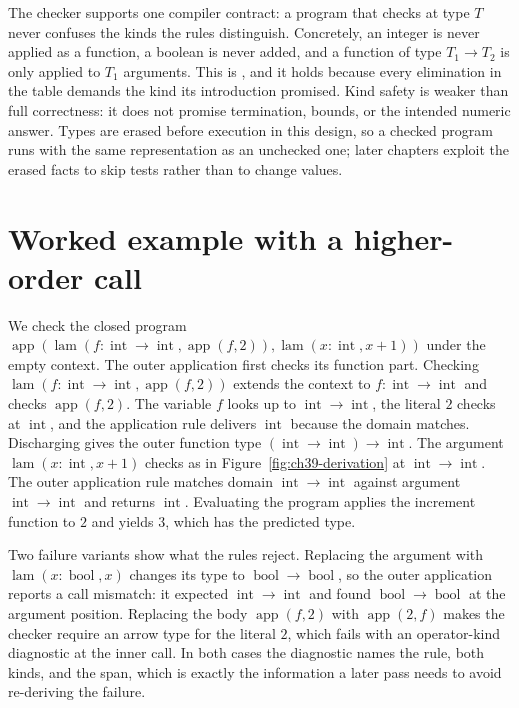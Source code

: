 The checker supports one compiler contract: a program that checks at type $T$ never confuses the kinds the rules distinguish.
Concretely, an integer is never applied as a function, a boolean is never added, and a function of type $T_1 \to T_2$ is only applied to $T_1$ arguments.
This is , and it holds because every elimination in the table demands the kind its introduction promised.
Kind safety is weaker than full correctness: it does not promise termination, bounds, or the intended numeric answer.
Types are erased before execution in this design, so a checked program runs with the same representation as an unchecked one; later chapters exploit the erased facts to skip tests rather than to change values.

\section{Worked example with a higher-order call}
\label{sec:ch39-worked}

We check the closed program $\operatorname{app}(\operatorname{lam}(f : \operatorname{int} \to \operatorname{int}, \operatorname{app}(f, 2)), \operatorname{lam}(x : \operatorname{int}, x + 1))$ under the empty context.
The outer application first checks its function part.
Checking $\operatorname{lam}(f : \operatorname{int} \to \operatorname{int}, \operatorname{app}(f, 2))$ extends the context to $f : \operatorname{int} \to \operatorname{int}$ and checks $\operatorname{app}(f, 2)$.
The variable $f$ looks up to $\operatorname{int} \to \operatorname{int}$, the literal $2$ checks at $\operatorname{int}$, and the application rule delivers $\operatorname{int}$ because the domain matches.
Discharging gives the outer function type $(\operatorname{int} \to \operatorname{int}) \to \operatorname{int}$.
The argument $\operatorname{lam}(x : \operatorname{int}, x + 1)$ checks as in Figure~\ref{fig:ch39-derivation} at $\operatorname{int} \to \operatorname{int}$.
The outer application rule matches domain $\operatorname{int} \to \operatorname{int}$ against argument $\operatorname{int} \to \operatorname{int}$ and returns $\operatorname{int}$.
Evaluating the program applies the increment function to $2$ and yields $3$, which has the predicted type.

Two failure variants show what the rules reject.
Replacing the argument with $\operatorname{lam}(x : \operatorname{bool}, x)$ changes its type to $\operatorname{bool} \to \operatorname{bool}$, so the outer application reports a call mismatch: it expected $\operatorname{int} \to \operatorname{int}$ and found $\operatorname{bool} \to \operatorname{bool}$ at the argument position.
Replacing the body $\operatorname{app}(f, 2)$ with $\operatorname{app}(2, f)$ makes the checker require an arrow type for the literal $2$, which fails with an operator-kind diagnostic at the inner call.
In both cases the diagnostic names the rule, both kinds, and the span, which is exactly the information a later pass needs to avoid re-deriving the failure.

